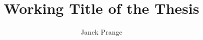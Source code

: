 \documentclass[]{proposalclass}
\title{Working Title of the Thesis}
\author{Janek Prange}
\begin{document}
\maketitle
\tableofcontents
\newpage




\clearpage

{\footnotesize}%
\end{document}
